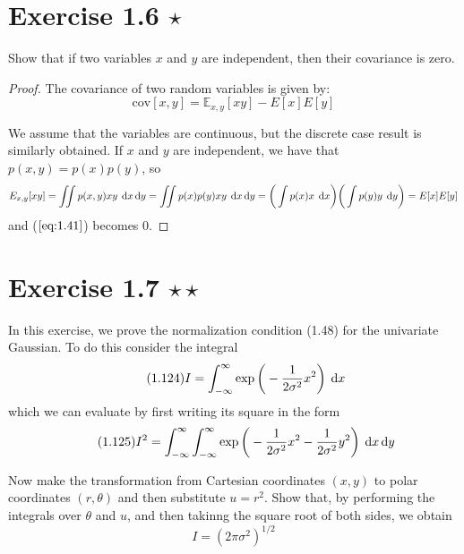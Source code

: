 \section*{Exercise 1.6 $\star$}
Show that if two variables $x$ and $y$ are independent, then their covariance is zero.

\vspace{1em}

\begin{proof}
    The covariance of two random variables is given by:
    \begin{equation}\label{eq:1.41}\tag{1.41}
        \text{cov}[x, y] = \mathbb{E}_{x, y} [xy] - E[x]E[y]
    \end{equation}

    We assume that the variables are continuous, but the discrete case result is similarly obtained.
    If $x$ and $y$ are independent, we have that $p(x, y) = p(x)p(y)$, so
     \[
         E_{x, y}[xy] = \iint p(x, y) xy \hspace{0.25em} \mathop{}\!\mathrm{d} x \mathop{}\!\mathrm{d} y 
         = \iint p(x) p(y) xy \hspace{0.25em} \mathop{}\!\mathrm{d} x \mathop{}\!\mathrm{d} y
         = \bigg(\int p(x) x \hspace{0.25em} \mathop{}\!\mathrm{d} x\bigg) \bigg(\int p(y) y \hspace{0.25em} \mathop{}\!\mathrm{d} y\bigg)
         = E[x]E[y]
    \] 
    and ($\ref{eq:1.41}$) becomes 0.
\end{proof}

\section*{Exercise 1.7 $\star \star$}
In this exercise, we prove the normalization condition (1.48) for the univariate
Gaussian. To do this consider the integral
\begin{equation}\label{eq:1.124}\tag{1.124}
    I = \int_{-\infty}^{\infty} \exp\bigg(-\frac{1}{2\sigma^2}x^2\bigg) \hspace{0.25em} \mathop{}\!\mathrm{d} x
\end{equation}
which we can evaluate by first writing its square in the form
\begin{equation}\label{eq:1.125}\tag{1.125}
    I^2 = \int_{-\infty}^{\infty} \int_{-\infty}^{\infty} \exp 
        \bigg(-\frac{1}{2\sigma^2}x^2 - \frac{1}{2\sigma^2}y^2\bigg) \hspace{0.25em} \mathop{}\!\mathrm{d} x\mathop{}\!\mathrm{d} y
\end{equation}

Now make the transformation from Cartesian coordinates $(x, y)$ to polar coordinates $(r, \theta)$ 
and then substitute $u = r^2$. Show that, by performing the integrals over $\theta$ and $u$,
and then takinng the square root of both sides, we obtain
\begin{equation}\label{eq:1.126}\tag{1.126}
    I = (2\pi\sigma^2)^{1/2}
\end{equation}

